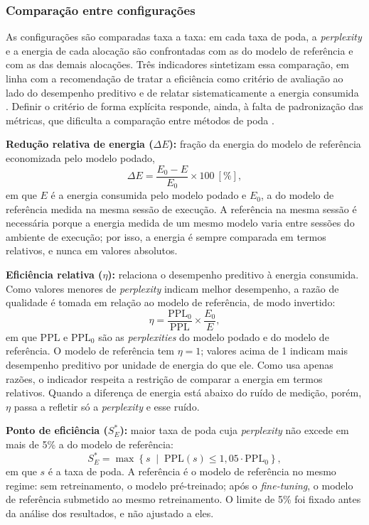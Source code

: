 \subsubsection*{Comparação entre configurações}

As configurações são comparadas taxa a taxa: em cada taxa de poda, a \textit{perplexity} e
a energia de cada alocação são confrontadas com as do modelo de referência e com as das
demais alocações. Três indicadores sintetizam essa comparação, em linha com a recomendação
de tratar a eficiência como critério de avaliação ao lado do desempenho preditivo
\cite{Schwartz2020} e de relatar sistematicamente a energia consumida
\cite{Henderson2020}. Definir o critério de forma explícita responde, ainda, à falta de
padronização das métricas, que dificulta a comparação entre métodos de poda
\cite{Blalock2020}.

\textbf{Redução relativa de energia ($\Delta E$):} fração da energia do modelo de
referência economizada pelo modelo podado,
\begin{equation}\label{eq:delta_e}
\Delta E = \frac{E_0 - E}{E_0} \times 100\ [\%],
\end{equation}
em que $E$ é a energia consumida pelo modelo podado e $E_0$, a do modelo de referência
medida na mesma sessão de execução. A referência na mesma sessão é necessária porque a
energia medida de um mesmo modelo varia entre sessões do ambiente de execução; por isso,
a energia é sempre comparada em termos relativos, e nunca em valores absolutos.

\textbf{Eficiência relativa ($\eta$):} relaciona o desempenho preditivo à energia
consumida. Como valores menores de \textit{perplexity} indicam melhor desempenho, a
razão de qualidade é tomada em relação ao modelo de referência, de modo invertido:
\begin{equation}\label{eq:eta}
\eta = \frac{\text{PPL}_0}{\text{PPL}} \times \frac{E_0}{E},
\end{equation}
em que $\text{PPL}$ e $\text{PPL}_0$ são as \textit{perplexities} do modelo podado e do
modelo de referência. O modelo de referência tem $\eta = 1$; valores acima de 1 indicam
mais desempenho preditivo por unidade de energia do que ele. Como usa apenas razões, o
indicador respeita a restrição de comparar a energia em termos relativos. Quando a
diferença de energia está abaixo do ruído de medição, porém, $\eta$ passa a refletir só a
\textit{perplexity} e esse ruído.

\textbf{Ponto de eficiência ($S^*_E$):} maior taxa de poda cuja \textit{perplexity} não
excede em mais de 5\% a do modelo de referência:
\begin{equation}\label{eq:ponto_eficiencia}
S^*_E = \max \left\{ s \;\middle|\; \text{PPL}(s) \leq 1{,}05 \cdot \text{PPL}_0 \right\},
\end{equation}
em que $s$ é a taxa de poda. A referência é o modelo de referência no mesmo regime: sem
retreinamento, o modelo pré-treinado; após o \textit{fine-tuning}, o modelo de referência
submetido ao mesmo retreinamento. O limite de 5\% foi fixado antes da análise dos
resultados, e não ajustado a eles.

